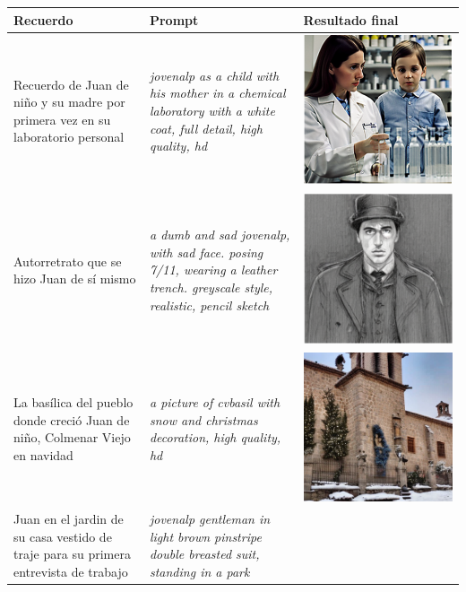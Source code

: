  \begin{table}
 	\centering
 	\begin{tabular}{>{\centering\arraybackslash}m{5cm} >{\arraybackslash}m{5cm}>{\arraybackslash}m{5cm}}
 		\textbf{Recuerdo} & \textbf{Prompt} & \textbf{Resultado final} \\
 		\hline
 		Recuerdo de Juan de niño y su madre por primera vez en su laboratorio personal & \textit{jovenalp as a child with his mother in a chemical laboratory with a white coat, full detail, high quality, hd} & \includegraphics[width = 0.3
 		\textwidth]{Imagenes/Vectorial/alpysumadrelab.png}\\
 		\hline
 		Autorretrato que se hizo Juan de sí mismo &\textit{a dumb and sad jovenalp, with sad face. posing 7/11, wearing a leather trench. greyscale style, realistic, pencil sketch} & \includegraphics[width = 0.3
 		\textwidth]{Imagenes/Vectorial/autoretratoalp.png}\\
 		\hline
 		La basílica del pueblo donde creció Juan de niño, Colmenar Viejo en navidad & \textit{a picture of cvbasil with snow and christmas decoration, high quality, hd} & \includegraphics[width = 0.3
 		\textwidth]{Imagenes/Vectorial/colmewinter.png}\\
 		\hline
 		Juan en el jardin de su casa vestido de traje para su primera entrevista de trabajo & \textit{jovenalp gentleman in light brown pinstripe double breasted suit, standing in a park} & \includegraphics[width = 0.3

\end{tabular}
\end{table}
